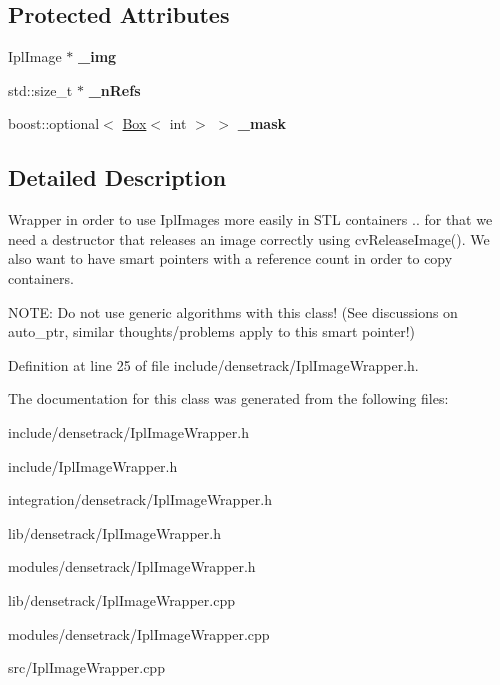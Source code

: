 \subsection*{Protected Attributes}
\begin{DoxyCompactItemize}
\item 
\hypertarget{class_ipl_image_wrapper_a03367d48181f4d5a241ea6495287d253}{
IplImage $\ast$ {\bfseries \_\-img}}
\label{class_ipl_image_wrapper_a03367d48181f4d5a241ea6495287d253}

\item 
\hypertarget{class_ipl_image_wrapper_a860707baa7e9831ac37de0ca35d531c9}{
std::size\_\-t $\ast$ {\bfseries \_\-nRefs}}
\label{class_ipl_image_wrapper_a860707baa7e9831ac37de0ca35d531c9}

\item 
\hypertarget{class_ipl_image_wrapper_adfddf3e075aa42c89a919ab590ddeab4}{
boost::optional$<$ \hyperlink{class_box}{Box}$<$ int $>$ $>$ {\bfseries \_\-mask}}
\label{class_ipl_image_wrapper_adfddf3e075aa42c89a919ab590ddeab4}

\end{DoxyCompactItemize}


\subsection{Detailed Description}
Wrapper in order to use IplImages more easily in STL containers .. for that we need a destructor that releases an image correctly using cvReleaseImage(). We also want to have smart pointers with a reference count in order to copy containers.

NOTE: Do not use generic algorithms with this class! (See discussions on auto\_\-ptr, similar thoughts/problems apply to this smart pointer!) 

Definition at line 25 of file include/densetrack/IplImageWrapper.h.



The documentation for this class was generated from the following files:\begin{DoxyCompactItemize}
\item 
include/densetrack/IplImageWrapper.h\item 
include/IplImageWrapper.h\item 
integration/densetrack/IplImageWrapper.h\item 
lib/densetrack/IplImageWrapper.h\item 
modules/densetrack/IplImageWrapper.h\item 
lib/densetrack/IplImageWrapper.cpp\item 
modules/densetrack/IplImageWrapper.cpp\item 
src/IplImageWrapper.cpp\end{DoxyCompactItemize}

